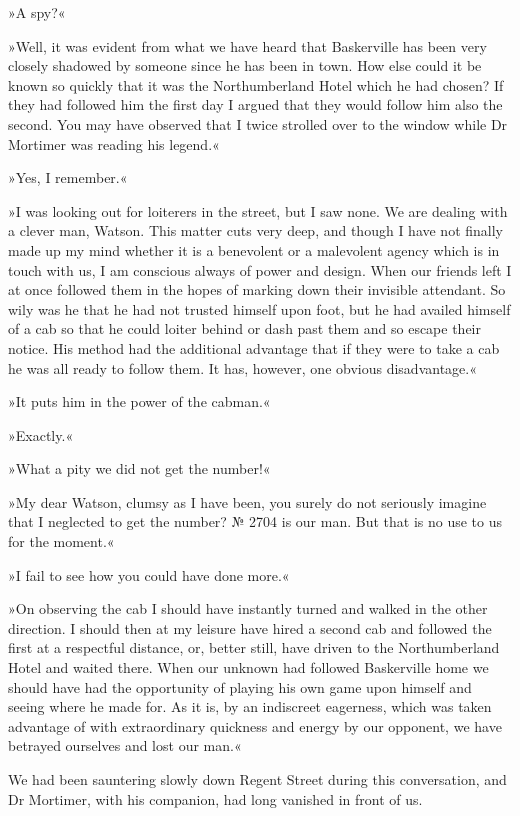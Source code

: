 »A spy?«

»Well, it was evident from what we have heard that Baskerville has been very closely shadowed by someone since he has been in town. How else could it be known so quickly that it was the Northumberland Hotel which he had chosen? If they had followed him the first day I argued that they would follow him also the second. You may have observed that I twice strolled over to the window while Dr Mortimer was reading his legend.«

»Yes, I remember.«

»I was looking out for loiterers in the street, but I saw none. We are dealing with a clever man, Watson. This matter cuts very deep, and though I have not finally made up my mind whether it is a benevolent or a malevolent agency which is in touch with us, I am conscious always of power and design. When our friends left I at once followed them in the hopes of marking down their invisible attendant. So wily was he that he had not trusted himself upon foot, but he had availed himself of a cab so that he could loiter behind or dash past them and so escape their notice. His method had the additional advantage that if they were to take a cab he was all ready to follow them. It has, however, one obvious disadvantage.«

»It puts him in the power of the cabman.«

»Exactly.«

»What a pity we did not get the number!«

»My dear Watson, clumsy as I have been, you surely do not seriously imagine that I neglected to get the number? № 2704 is our man. But that is no use to us for the moment.«

»I fail to see how you could have done more.«

»On observing the cab I should have instantly turned and walked in the other direction. I should then at my leisure have hired a second cab and followed the first at a respectful distance, or, better still, have driven to the Northumberland Hotel and waited there. When our unknown had followed Baskerville home we should have had the opportunity of playing his own game upon himself and seeing where he made for. As it is, by an indiscreet eagerness, which was taken advantage of with extraordinary quickness and energy by our opponent, we have betrayed ourselves and lost our man.«

We had been sauntering slowly down Regent Street during this conversation, and Dr Mortimer, with his companion, had long vanished in front of us.

